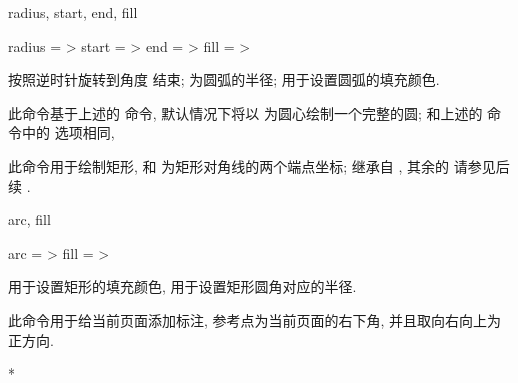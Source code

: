 \documentclass[
  hyper, 
  lang = cn, 
  class = l3doc,
  classOption={11pt},
  sect = {load=false},
]{../../zlatex/code/ztex}
\begin{document}
\begin{keyval}[parent=ztool/../zarc]{radius, start, end, fill}
  \begin{syntax}
    radius = >
    start  = >
    end    = >
    fill   = >
  \end{syntax}
   按照逆时针旋转到角度  结束;  为圆弧的半径;
   用于设置圆弧的填充颜色.
\end{keyval}


\begin{function}[added=2025-05-13]{\zcircle}
  \begin{syntax}
  \end{syntax}
  此命令基于上述的  命令, 默认情况下将以 \texttt{} 为圆心绘制一个完整的圆;
   和上述的  命令中的  选项相同,
\end{function}


\begin{function}[added=2025-05-13]{\zrectangle}
  \begin{syntax}
  \end{syntax}
  此命令用于绘制矩形, \texttt{} 和 \texttt{} 为矩形对角线的两个端点坐标;
   继承自 , 其余的  
  请参见后续 .
\end{function}


\begin{keyval}[parent=ztool/../zrectangle]{arc, fill}
  \begin{syntax}
    arc  = >
    fill = >
  \end{syntax}
   用于设置矩形的填充颜色,  用于设置矩形圆角对应的半径.
\end{keyval}


\begin{function}[added=2025-07-09]{\zpin}
  \begin{syntax}
  \end{syntax}
  此命令用于给当前页面添加标注, 参考点为当前页面的右下角, 并且取向右向上为正方向.
\end{function}
\begin{DocExample}*
\end{DocExample}
\end{document}
